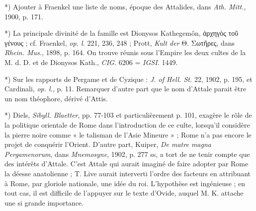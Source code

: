 \documentclass[a4paper, 11pt, oneside, polutonikogreek, french]{article}
\begin{document}
*) Ajouter à Fraenkel une liste de noms, époque des Attalides, dans \emph{Ath. Mitt.}, 1900, p. 171.

*) La principale divinité de la famille est Dionysos Kathegemôn, ἀρχηγὸς τοῦ γένους ; cf. Fraenkel, \emph{op. l.} 221, 236, 248 ; Prott, \emph{Kult der} Θ. Σωτῆρες, dans \emph{Rhein. Mus.}, 1898, p. 164. On trouve réunis sous l'Empire les deux cultes de la M. d. D. et de Dionysos Kath., \emph{CIG.} 6206 = \emph{IGSI.} 1449.

*) Sur les rapports de Pergame et de Cyzique : \emph{J. of Hell. St.} 22, 1902, p. 195, et Cardinali, \emph{op. l.}, p. 11. Remarquer d'autre part que le nom d'Attale parait être un nom théophore, dérivé d'Attis.

*) Diels, \emph{Sibyll. Blaetter}, pp. 77-103 et particulièrement p. 101, exagère le rôle de la politique orientale de Rome dans l'introduction de ce culte, lorsqu'il considère la pierre noire comme « le talisman de l'Asie Mineure » ; Rome n'a pas encore le projet de conquérir l'Orient. D'autre part, Kuiper, \emph{De matre magna Pergamenorum}, dans \emph{Mnemosyne}, 1902, p. 277 ss, a tort de ne tenir compte que des intérêts d'Attale. C'est Attale qui aurait imaginé de faire adopter par Rome la déesse anatolienne ; T. Live aurait interverti l'ordre des facteurs en attribuant à Rome, par gloriole nationale, une idée du roi. L'hypothèse est ingénieuse ; en tout cas, il est difficile de l'appuyer sur le texte d'Ovide, auquel M. K. attache une si grande importance.
\end{document}
